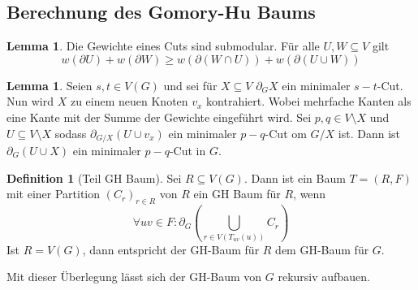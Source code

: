 \documentclass[a4paper, 12pt]{article}
\theoremstyle{plain}
\theoremstyle{definition}
\newtheorem{definition}[theorem]{Definition} %
\theoremstyle{lemma}
\newtheorem{lemma}[theorem]{Lemma}
\theoremstyle{remark}
\theoremstyle{corollary}
\theoremstyle{example}
\begin{document}
	\subsection{Berechnung des Gomory-Hu Baums}
	\begin{lemma}
		Die Gewichte eines Cuts sind submodular. Für alle $U,W\subseteq V$ gilt \[w(\partial U) + w(\partial W) \geq w(\partial (W\cap U)) + w(\partial (U \cup W))\]
	\end{lemma}
	\begin{lemma}
		Seien $s,t \in V(G)$ und sei für $X\subseteq V$ $\partial_G X$ ein minimaler $s-t$-Cut. Nun wird $X$ zu einem neuen Knoten $v_x$ kontrahiert. Wobei mehrfache Kanten als eine Kante mit der Summe der Gewichte eingeführt wird. Sei $p,q \in V\setminus X$ und $U\subseteq V\setminus X$ sodass $\partial_{G/X}(U\cup v_x)$ ein minimaler $p-q$-Cut om $G/X$ ist. Dann ist $\partial_G(U\cup X)$ ein minimaler $p-q$-Cut in $G$.
	\end{lemma}
	\begin{definition}[Teil GH Baum]
		Sei $R\subseteq V(G)$. Dann ist ein Baum $T = (R,F)$ mit einer Partition $(C_r)_{r\in R}$ von $R$ ein GH Baum für $R$, wenn \[\forall uv \in F: \partial_G \left(\bigcup_{r \in V(T_{uv}(u))} C_r\right)\] Ist $R=V(G)$, dann entspricht der GH-Baum für $R$ dem GH-Baum für $G$.
	\end{definition}
	Mit dieser Überlegung lässt sich der GH-Baum von $G$ rekursiv aufbauen.
\end{document}
